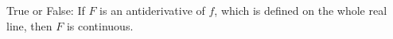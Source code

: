 \documentclass{ximera}
\author{Steven Gubkin}
\begin{document}
\begin{exercise}

True or False: If $F$ is an antiderivative of $f$, which is defined on the whole real line, then $F$ is continuous.

	\begin{multipleChoice}	
	\end{multipleChoice}

\end{exercise}
\end{document}
